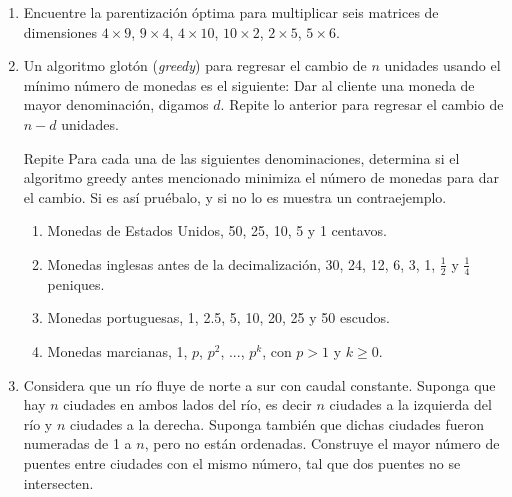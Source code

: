 \documentclass[11pt,letterpaper]{article}
\begin{document}
\begin{enumerate}[leftmargin=*]
    \item Encuentre la parentización óptima para multiplicar seis matrices de dimensiones $4\times9$, $9\times4$, $4\times10$, $10\times2$, $2\times5$, $5\times6$.
    
    \item Un algoritmo glotón (\textit{greedy}) para regresar el cambio de $n$ unidades usando el mínimo número de monedas es el siguiente: Dar al cliente una moneda de mayor denominación, digamos $d$. Repite lo anterior para regresar el cambio de $n - d$ unidades.
    
    Repite Para cada una de las siguientes denominaciones, determina si el algoritmo greedy antes mencionado minimiza el número de monedas para dar el cambio. Si es así pruébalo, y si no lo es muestra un contraejemplo.
    
    \begin{enumerate}[label=\alph*)]
        \item Monedas de Estados Unidos, 50, 25, 10, 5 y 1 centavos.
        
        \item Monedas inglesas antes de la decimalización, 30, 24, 12, 6, 3, 1, $\frac{1}{2}$ y $\frac{1}{4}$ peniques.
        
        \item Monedas portuguesas, 1, 2.5, 5, 10, 20, 25 y 50 escudos.
        
        \item Monedas marcianas, 1, $p$, $p^2$, ..., $p^k$, con $p > 1$ y $k \geq 0$.
    \end{enumerate}
    
    \item Considera que un río fluye de norte a sur con caudal constante. Suponga que hay $n$ ciudades en ambos lados del río, es decir $n$ ciudades a la izquierda del río y $n$ ciudades a la derecha. Suponga también que dichas ciudades fueron numeradas de 1 a $n$, pero no están ordenadas. Construye el mayor número de puentes entre ciudades con el mismo número, tal que dos puentes no se intersecten.
  \end{enumerate}
\end{document}
